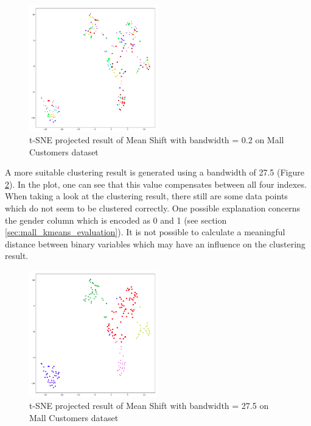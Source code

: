 \begin{figure}[!ht]
\begin{center}
\includegraphics[width=0.5\textwidth]{images/Meanshift_Mall_4_6.png}
\caption{t-SNE projected result of Mean Shift with bandwidth = 0.2 on Mall Customers dataset}
\end{center}
\label{fig:meanshift_mall_4_6}
\end{figure}

A more suitable clustering result is generated using a bandwidth of 27.5 (Figure \ref{fig:meanshift_mall_27}). In the plot, one can see that this value compensates between all four indexes.
When taking a look at the clustering result, there still are some data points which do not seem to be clustered correctly. One possible explanation concerns the gender column which is encoded as 0 and 1 (see section \ref{sec:mall_kmeans_evaluation}). It is not possible to calculate a meaningful distance between binary variables which may have an influence on the clustering result. 

\begin{figure}[!ht]
\begin{center}
\includegraphics[width=0.5\textwidth]{images/Meanshift_Mall_27_5.png}
\caption{t-SNE projected result of Mean Shift with bandwidth = 27.5 on Mall Customers dataset}
\end{center}
\label{fig:meanshift_mall_27}
\end{figure}


